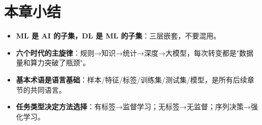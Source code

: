 \documentclass[a4paper,11pt]{ctexart}
\begin{document}
\section{本章小结}
\begin{itemize}
    \item \textbf{ML 是 AI 的子集，DL 是 ML 的子集}：三层嵌套，不要混用。
    \item \textbf{六个时代的主旋律}：规则→知识→统计→深度→大模型，每次转变都是"数据量和算力突破了瓶颈"。
    \item \textbf{基本术语是语言基础}：样本/特征/标签/训练集/测试集/模型，是所有后续章节的共同语言。
    \item \textbf{任务类型决定方法选择}：有标签→监督学习；无标签→无监督；序列决策→强化学习。
\end{itemize}
\end{document}
